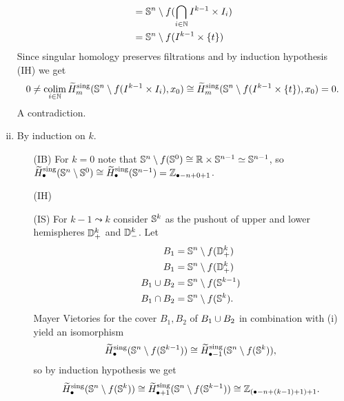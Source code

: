 \begin{sketch}
\begin{enumerate}[(i)]
{\begin{enumerate}
{\begin{tab}[1.3cm]
\begin{align*}
								&= \S^n \setminus f(\Intersection \limits_{i \in \N} I^{k-1} \times I_i)\\
								&= \S^n \setminus f(I^{k-1} \times \{t\})
							\end{align*}
							Since singular homology preserves filtrations and by induction hypothesis (IH) we get
							\begin{equation*}
								0 \neq \colim \limits_{i \in \N} \widetilde{H}_m^\text{sing}(\S^n \setminus f(I^{k-1}\times I_i),x_0) \isom \widetilde{H}_m^\text{sing}(\S^n \setminus f(I^{k-1}\times \{t\}),x_0) = 0.
							\end{equation*}
							A contradiction.
						\end{tab}
					}
				\end{enumerate}
			}
			\item{
				By induction on $k$.
				\begin{enumerate}
					\item[(IB)]{
						For $k=0$ note that $\S^n \setminus f(\S^0) \isom \R \times \S^{n-1} \simeq \S^{n-1}$, so $\widetilde{H}_\bullet^\text{sing}(\S^n \setminus \S^0) \isom \widetilde{H}_\bullet^\text{sing}(\S^{n-1}) = \Z_{\bullet-n+0+1}$.
					}
					\item[(IH)]{
					}
					\item[(IS)]{
						For $k-1 \leadsto k$ consider $\S^k$ as the pushout of upper and lower hemispheres $\D^k_{+}$ and $\D^k_{-}$. Let
						\begin{align*}
							B_1 &= \S^n \setminus f(\D^k_{+})\\
							B_1 &= \S^n \setminus f(\D^k_{+})\\
							B_1 \union B_2 &= \S^n \setminus f(\S^{k-1})\\
							B_1 \intersection B_2 &= \S^n \setminus f(\S^k).
						\end{align*}
						Mayer Vietories for the cover $B_1,B_2$ of $B_1 \union B_2$ in combination with (i) yield an isomorphism
						\begin{equation*}
							\widetilde{H}_\bullet^\text{sing}(\S^n \setminus f(\S^{k-1})) \isom \widetilde{H}_{\bullet-1}^\text{sing}(\S^n \setminus f(\S^{k})),
						\end{equation*}
						so by induction hypothesis we get
						\begin{equation*}
							\widetilde{H}_{\bullet}^\text{sing}(\S^n \setminus f(\S^{k})) \isom \widetilde{H}_{\bullet+1}^\text{sing}(\S^n \setminus f(\S^{k-1})) \isom \Z_{(\bullet-n+(k-1)+1)+1}.
						\end{equation*}
					}
				\end{enumerate}
			}\vspace{-2.5em}
		\end{enumerate}
	\end{sketch}

